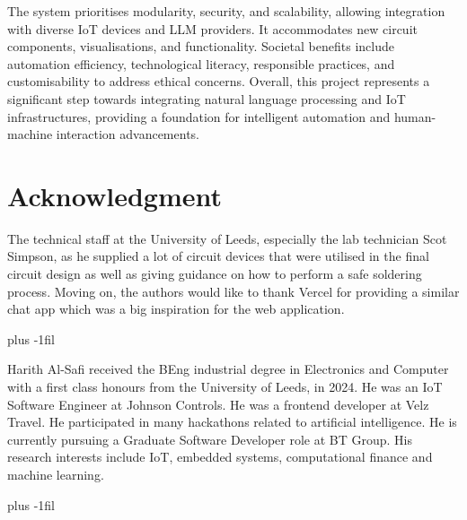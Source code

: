 \documentclass{ieeeaccess}
\begin{document}
The system prioritises modularity, security, and scalability, allowing integration with diverse IoT devices and LLM providers. It accommodates new circuit components, visualisations, and functionality. Societal benefits include automation efficiency, technological literacy, responsible practices, and customisability to address ethical concerns. Overall, this project represents a significant step towards integrating natural language processing and IoT infrastructures, providing a foundation for intelligent automation and human-machine interaction advancements. 

\section*{Acknowledgment}
The technical staff at the University of Leeds, especially the lab technician Scot Simpson, as he supplied a lot of circuit devices that were utilised in the final circuit design as well as giving guidance on how to perform a safe soldering process. Moving on, the authors would like to thank Vercel for providing a similar chat app which was a big inspiration for the web application.




\baselineskip plus -1fil


\begin{IEEEbiography}{Harith Al-Safi} received the BEng industrial degree in Electronics and Computer with a first class honours from the University of Leeds, in 2024. He was an IoT Software Engineer at Johnson Controls. He was a frontend developer at Velz Travel.  He participated in many hackathons related to artificial intelligence. He is currently pursuing a Graduate Software Developer role at BT Group. His research interests include IoT, embedded systems, computational finance and machine learning.
\end{IEEEbiography}

\baselineskip plus -1fil
\end{document}
